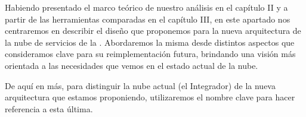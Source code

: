 Habiendo presentado el marco teórico de nuestro análisis en el capítulo II y a partir de las herramientas comparadas en el capítulo III, en este apartado nos centraremos en describir el diseño que proponemos para la nueva arquitectura de la nube de servicios de la {\unlp}. Abordaremos la misma desde distintos aspectos que consideramos clave para su reimplementación futura, brindando una visión más orientada a las necesidades que vemos en el estado actual de la nube.

De aquí en más, para distinguir la nube actual (el Integrador) de la nueva arquitectura que estamos proponiendo, utilizaremos el nombre clave \textit{\cloud} para hacer referencia a esta última.
